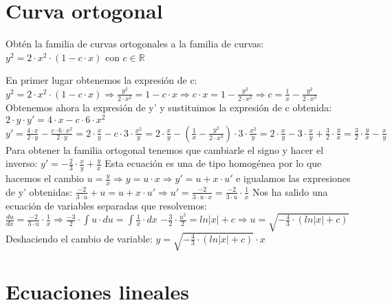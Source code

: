 \section{Curva ortogonal}
\begin{ejer}
	Obtén la familia de curvas ortogonales a la familia de curvas:  
	$y^2 = 2\cdot x^2\cdot (1-c\cdot x)$ con $c\in \mathbb{R}$
\end{ejer}
\begin{sol}
	En primer lugar obtenemos la expresión de c:  
	$y^2 = 2\cdot x^2 \cdot (1-c\cdot x)\Rightarrow \frac{y^2}{2\cdot x^2} = 1-c\cdot x \Rightarrow c\cdot x = 1-\frac{y^2}{2\cdot x^2} \Rightarrow c = \frac{1}{x} - \frac{y^2}{2\cdot x^3}$  
	Obtenemos ahora la expresión de y' y sustituimos la expresión de c obtenida:  
	$2\cdot y\cdot y' = 4\cdot x - c\cdot 6\cdot x^2$  
	$y' = \frac{4\cdot x}{2\cdot y}-\frac{c\cdot 6\cdot x^2}{2\cdot y} = 2\cdot \frac{x}{y}-c\cdot 3\cdot \frac{x^2}{y} = 2\cdot \frac{x}{y}-(\frac{1}{x}-\frac{y^2}{2\cdot x^3})\cdot 3\cdot \frac{x^2}{y} = 2\cdot \frac{x}{y}-3\cdot \frac{x}{y} + \frac{3}{2}\cdot \frac{y}{x} = \frac{3}{2}\cdot \frac{y}{x} - \frac{x}{y}$  
	Para obtener la familia ortogonal tenemos que cambiarle el signo y hacer el inverso:  
	$y' = -\frac{2}{3}\cdot \frac{x}{y} + \frac{y}{x}$  
	Esta ecuación es una de tipo homogénea por lo que hacemos el cambio $u = \frac{y}{x} \Rightarrow y = u\cdot x\Rightarrow y' = u+x\cdot u'$  e igualamos las expresiones de y' obtenidas:  
	$\frac{-2}{3\cdot u} + u = u + x\cdot u'\Rightarrow u' = \frac{-2}{3\cdot u\cdot x} = \frac{-2}{3\cdot u}\cdot \frac{1}{x}$  
	Nos ha salido una ecuación de variables separadas que resolvemos:  
	$\frac{du}{dx} = \frac{-2}{3\cdot u}\cdot \frac{1}{x}\Rightarrow \frac{-3}{2}\cdot \int u\cdot du = \int \frac{1}{x}\cdot dx$  
	$-\frac{3}{2}\cdot \frac{u^2}{2} = ln|x| + c \Rightarrow u = \sqrt{-\frac{4}{3}\cdot(ln|x| + c)}$  
	Deshaciendo el cambio de variable:  
	$y = \sqrt{-\frac{4}{3}\cdot (ln|x| + c)}\cdot x$
\end{sol}


\section{Ecuaciones lineales}

